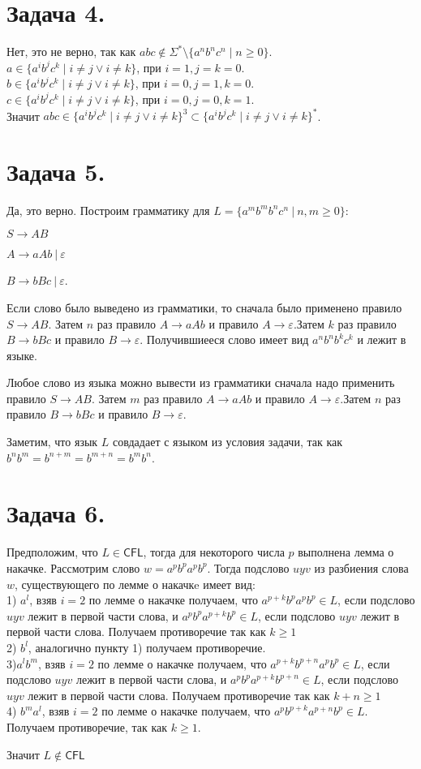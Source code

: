 \documentclass[12pt]{article}
\theoremstyle{definition}
\theoremstyle{definition}
\let\geq\geqslant
\let\ra\rightarrow
\let\epsilon\varepsilon
\def\CFL{{\mathsf{CFL}}}
\begin{document}
\section*{Задача 4.}
Нет, это не верно, так как $abc \notin \Sigma^*\setminus \{ a^nb^nc^n \mid n\geq 0  \}$.\\
$a \in \{a^ib^jc^k \mid i\neq j \lor i \neq k \}$, при $i = 1, j = k = 0$.\\
$b \in \{a^ib^jc^k \mid i\neq j \lor i \neq k \}$, при $i = 0, j = 1, k = 0$.\\
$c \in \{a^ib^jc^k \mid i\neq j \lor i \neq k \}$, при $i = 0, j = 0, k = 1$.\\
Значит $abc \in \{a^ib^jc^k \mid i\neq j \lor i \neq k \}^3 \subset \{a^ib^jc^k \mid i\neq j \lor i \neq k \}^*$.
\section*{Задача 5.}
Да, это верно. Построим грамматику для $L = \{a^mb^mb^nc^n\ |\ n, m \geq 0 \}$:

$S\ra AB$

$A\ra aAb\ |\ \epsilon$

$B\ra bBc\ |\ \epsilon$.

Если слово было выведено из грамматики, то сначала было применено правило $S\ra AB$. Затем $n$ раз правило $A\ra aAb$ и правило $A\ra \epsilon$.Затем $k$ раз правило $B\ra bBc$ и правило $B\ra \epsilon$. Получившиееся слово имеет вид $a^nb^nb^kc^k$ и лежит в языке.
 
Любое слово из языка можно вывести из грамматики сначала надо применить правило $S\ra AB$. Затем $m$ раз правило $A\ra aAb$ и правило $A\ra \epsilon$.Затем $n$ раз правило $B\ra bBc$ и правило $B\ra \epsilon$.

Заметим, что язык $L$ совдадает с языком из условия задачи, так как $b^nb^m=b^{n+m} = b^{m+n} = b^mb^n$.

\section*{Задача 6.}
Предположим, что $L\in \CFL$, тогда для некоторого числа $p$ выполнена лемма о накачке. Рассмотрим слово $w = a^pb^pa^pb^p$. Тогда подслово $uyv$ из разбиения слова $w$, существующего по лемме о накачкe имеет вид:\\
1) $a^l$, взяв $i = 2$ по лемме о накачке получаем, что $a^{p+k}b^pa^pb^p \in L$, если подслово $uyv$ лежит в первой части слова, и $a^{p}b^pa^{p+k}b^p \in L$, если подслово $uyv$ лежит в первой части слова. Получаем противоречие так как $k \geq 1$\\
2) $b^l$, аналогично пункту 1) получаем противоречие.\\
3)$a^lb^m$,  взяв $i = 2$ по лемме о накачке получаем, что $a^{p+k}b^{p+n}a^pb^p \in L$, если подслово $uyv$ лежит в первой части слова, и $a^{p}b^pa^{p+k}b^{p+n} \in L$, если подслово $uyv$ лежит в первой части слова. Получаем противоречие так как $k+n \geq 1$\\
4) $b^ma^l$, взяв $i = 2$ по лемме о накачке получаем, что $a^{p}b^{p+k}a^{p+n}b^p \in L$. Получаем противоречие, так как $k \geq 1$.

Значит $L \notin \CFL$
\end{document}
